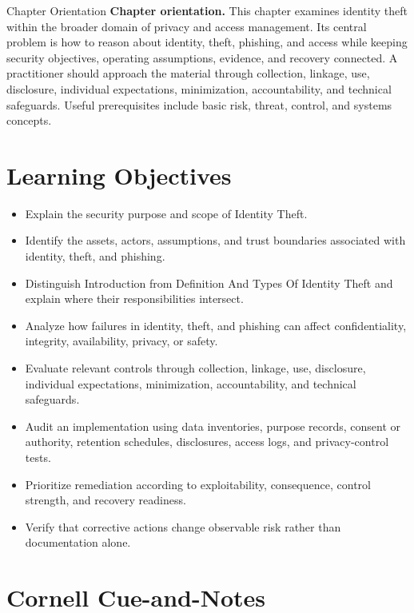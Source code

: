 \documentclass[11pt,letterpaper]{article}
\title{\CornellDocumentTitle}
\author{}
\date{}
\begin{document}
\maketitle
\begin{CornellOverviewBox}{Chapter Orientation}
\textbf{Chapter orientation.} This chapter examines identity theft within the broader domain of privacy and access management. Its central problem is how to reason about identity, theft, phishing, and access while keeping security objectives, operating assumptions, evidence, and recovery connected. A practitioner should approach the material through collection, linkage, use, disclosure, individual expectations, minimization, accountability, and technical safeguards. Useful prerequisites include basic risk, threat, control, and systems concepts.
\end{CornellOverviewBox}
\section*{Learning Objectives}
\begin{itemize}
\item Explain the security purpose and scope of Identity Theft.
\item Identify the assets, actors, assumptions, and trust boundaries associated with identity, theft, and phishing.
\item Distinguish Introduction from Definition And Types Of Identity Theft and explain where their responsibilities intersect.
\item Analyze how failures in identity, theft, and phishing can affect confidentiality, integrity, availability, privacy, or safety.
\item Evaluate relevant controls through collection, linkage, use, disclosure, individual expectations, minimization, accountability, and technical safeguards.
\item Audit an implementation using data inventories, purpose records, consent or authority, retention schedules, disclosures, access logs, and privacy-control tests.
\item Prioritize remediation according to exploitability, consequence, control strength, and recovery readiness.
\item Verify that corrective actions change observable risk rather than documentation alone.
\end{itemize}
\section*{Cornell Cue-and-Notes}
\end{document}
